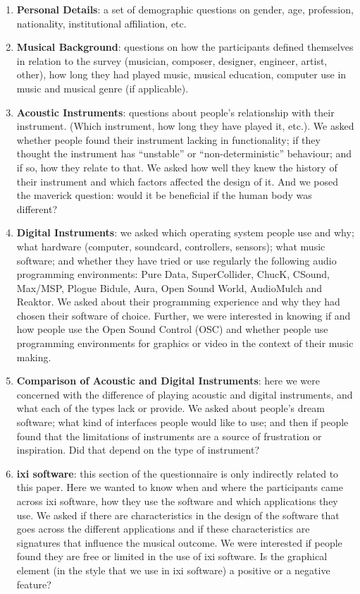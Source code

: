 \begin{enumerate}
\item \textbf{Personal Details}: a set of demographic questions on gender, age,
profession, nationality, institutional affiliation, etc.

\item \textbf{Musical Background}: questions on how the participants defined
themselves in relation to the survey (musician, composer, designer, engineer,
artist, other), how long they had played music, musical education, computer use
in music and musical genre (if applicable).

\item \textbf{Acoustic Instruments}: questions about people's relationship with
their instrument. (Which instrument, how long they have played it, etc.). We
asked whether people found their instrument lacking in functionality; if they
thought the instrument has ``unstable'' or ``non-deterministic'' behaviour; and
if so, how they relate to that. We asked how well they knew the history of their
instrument and which factors affected the design of it. And we posed the maverick
question: would it be beneficial if the human body was different?

\item \textbf{Digital Instruments}: we asked which operating system people use and
why; what hardware (computer, soundcard, controllers, sensors); what music
software; and whether they have tried or use regularly the following audio
programming environments: Pure Data, SuperCollider, ChucK, CSound, Max/MSP,
Plogue Bidule, Aura, Open Sound World, AudioMulch and Reaktor. We asked about
their programming experience and why they had chosen their software of choice.
Further, we were interested in knowing if and how people use the Open Sound
Control (OSC) and whether people use programming environments for graphics or
video in the context of their music making.

\item \textbf{Comparison of Acoustic and Digital Instruments}: here we were
concerned with the difference of playing acoustic and digital instruments, and
what each of the types lack or provide. We asked about people's dream software;
what kind of interfaces people would like to use; and then if people found that
the limitations of instruments are a source of frustration or inspiration. Did
that depend on the type of instrument?

\item \textbf{ixi software}: this section of the questionnaire is only indirectly
related to this paper. Here we wanted to know when and where the participants
came across ixi software, how they use the software and which applications they
use. We asked if there are characteristics in the design of the software that
goes across the different applications and if these characteristics are
signatures that influence the musical outcome. We were interested if people found
they are free or limited in the use of ixi software. Is the graphical element (in
the style that we use in ixi software) a positive or a negative feature?
\end{enumerate}

